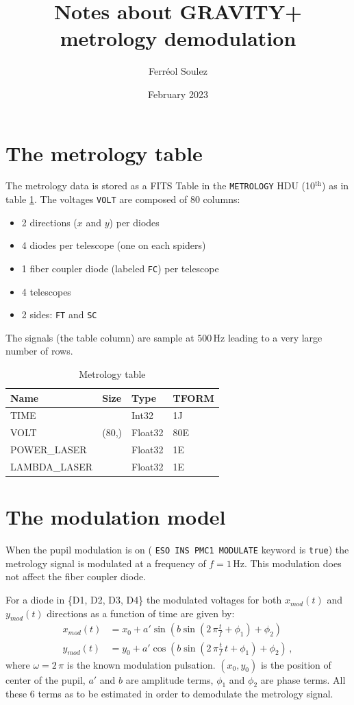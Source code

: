 \documentclass[a4paper,11pt,twoside]{scrartcl}
\title{Notes about GRAVITY+ metrology demodulation}
\author{Ferréol Soulez }
\date{February 2023}
\begin{document}
\maketitle

\section{The metrology table}
The metrology data is stored as a FITS Table in the \verb+METROLOGY+ HDU (10$^\textrm{th}$) as in table \ref{tab:table}. The voltages \verb+VOLT+ are composed of $80$ columns:
\begin{itemize}
    \item 2 directions ($x$ and  $y$) per diodes
    \item 4 diodes per telescope (one on each spiders)
    \item 1 fiber coupler diode (labeled \verb+FC+) per telescope
    \item 4 telescopes
    \item 2 sides: \verb|FT|  and \verb|SC|
\end{itemize}
The signals (the table column) are sample at $500\,$Hz leading to a very large number of rows. 
\begin{table}[]
    \centering
    \begin{tabular}{l| l ll}
Name   &       Size  & Type  &   TFORM   \\
\hline
TIME   &              & Int32  &  1J     \\
VOLT   &       (80,) & Float32 &  80E    \\
POWER\_LASER   &    &   Float32 & 1E     \\
LAMBDA\_LASER   &    &  Float32 & 1E     
    \end{tabular}
    \caption{Metrology table}
    \label{tab:table}
\end{table}

\section{The modulation model}

When the pupil modulation is on ( \verb|ESO INS PMC1 MODULATE| keyword is \verb|true|) the metrology signal is modulated at a frequency of $f=1\,$Hz. 
This modulation does not affect the fiber coupler diode.

For a  diode in \{D1, D2, D3, D4\} the modulated voltages for both $x_{mod}(t)$ and $y_{mod}(t)$ directions as a function of time are given by:
\begin{align}
x_{mod}(t) &= x_0 + a' \sin\left(b \sin\left(2\,\pi\frac{t}{f} + \phi_1\right) + \phi_2\right) \label{eq:x0} \\
y_{mod}(t) &= y_0 + a' \cos\left(b \sin\left(2\,\pi\frac{t}{f}\,t + \phi_1\right) + \phi_2\right)\,,\label{eq:y0}
\end{align}
where $\omega = 2\,\pi$ is the known modulation pulsation. $(x_0,y_0)$ is the position of center of the pupil, $a'$ and $b$ are amplitude terms, $\phi_1$   and $\phi_2$ are phase terms. All these 6 terms as to be estimated in order to demodulate the metrology signal. 
\end{document}
